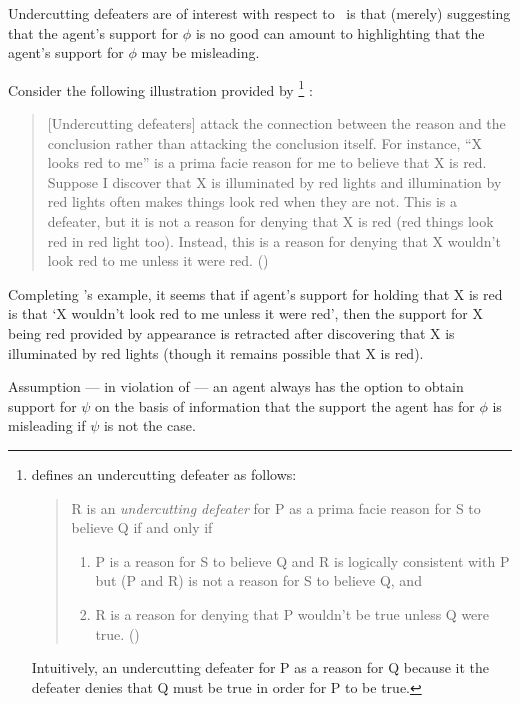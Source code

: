\begin{note}
   Undercutting defeaters are of interest with respect to~\nI{} is that (merely) suggesting that the agent's support for \(\phi\) is no good can amount to highlighting that the agent's support for \(\phi\) may be misleading.

  Consider the following illustration provided by \citeauthor{Pollock:1987un}\nolinebreak
  \footnote{
    \citeauthor{Pollock:1987un} defines an undercutting defeater as follows:
    \begin{quote}
      R is an \emph{undercutting defeater} for P as a prima facie reason for S to believe Q if and only if
      \begin{enumerate}[label=(UD\arabic*), ref=(UD\arabic*)]
      \item P is a reason for S to believe Q and R is logically consistent with P but (P and R) is not a reason for S to believe Q, and
      \item R is a reason for denying that P wouldn't be true unless Q were true.\nolinebreak
        \mbox{}\hfill\mbox{(\citeyear[485]{Pollock:1987un})}
      \end{enumerate}
    \end{quote}
    Intuitively, an undercutting defeater for P as a reason for Q because it the defeater denies that Q must be true in order for P to be true.
  }\nolinebreak
  :
  \begin{quote}
    [Undercutting defeaters] attack the connection between the reason and the conclusion rather than attacking the conclusion itself.
    For instance, ``X looks red to me'' is a prima facie reason for me to believe that X is red.
    Suppose I discover that X is illuminated by red lights and illumination by red lights often makes things look red when they are not.
    This is a defeater, but it is not a reason for denying that X is red (red things look red in red light too).
    Instead, this is a reason for denying that X wouldn't look red to me unless it were red.\nolinebreak
    \mbox{}\hfill\mbox{(\citeyear[485]{Pollock:1987un})}
  \end{quote}
  Completing \citeauthor{Pollock:1987un}'s example, it seems that if agent's support for holding that X is red is that `X wouldn't look red to me unless it were red', then the support for X being red provided by appearance is retracted after discovering that X is illuminated by red lights (though it remains possible that X is red).

  Assumption --- in violation of \nI{} --- an agent always has the option to obtain support for \(\psi\) on the basis of information that the support the agent has for \(\phi\) is misleading if \(\psi\) is not the case.


\end{note}
